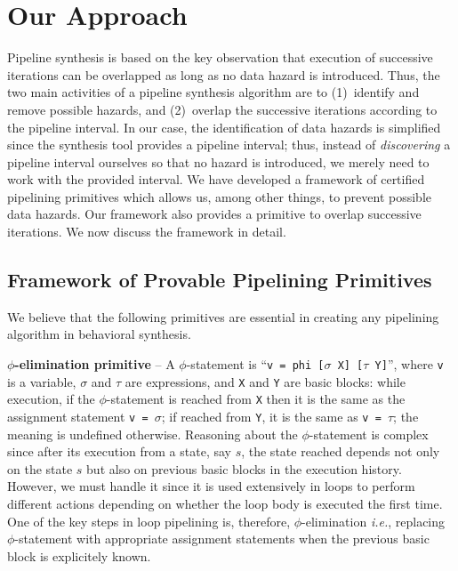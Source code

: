 \chapter{Our Approach}
\label{sec:pipelining-algorithm}

Pipeline synthesis is based on the key observation that
execution of successive iterations can be overlapped as long
as no data hazard is introduced. Thus, the two main
activities of a pipeline synthesis algorithm are to
(1)~identify and remove possible hazards, and (2)~overlap the
successive iterations according to the pipeline interval. In our case,
the identification of data hazards is simplified since the synthesis tool
provides a pipeline interval; thus, instead of {\em
discovering} a pipeline interval ourselves so that no
hazard is introduced, we merely need to work with the
provided interval. We have developed a framework of certified pipelining
primitives which allows us, among other things, to prevent possible data
hazards. Our framework also provides a primitive
to overlap successive iterations. We now discuss
the framework in detail.

\section{Framework of Provable Pipelining Primitives}

We believe that the following primitives are essential in creating any pipelining
algorithm in behavioral synthesis.

{\textbf {$\phi$-elimination primitive}} -- A $\phi$-statement is ``{\tt v = phi
[$\sigma$ X] [$\tau$ Y]}'', where {\tt v} is a
variable, $\sigma$ and $\tau$ are expressions, and {\tt X}
and {\tt Y} are basic blocks: while execution, if the $\phi$-statement is
reached from {\tt X} then it
is the same as the assignment statement
{\tt v = $\sigma$}; if reached from {\tt Y}, it is the same as {\tt v = $\tau$};
the meaning is undefined otherwise.
Reasoning about the $\phi$-statement is complex since after its
execution from a state, say $s$, the state reached depends not only
on the state $s$ but also on previous basic blocks in the execution history.
However, we must handle it since it is used extensively in
loops to perform different actions depending on whether the
loop body is executed the first time. One of the key steps in loop pipelining is,
therefore, $\phi$-elimination {\em i.e.}, replacing
$\phi$-statement with appropriate assignment statements when the previous basic block is explicitely known.

